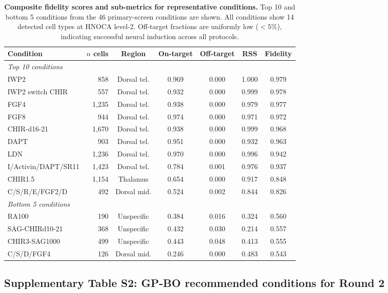 \documentclass[times,twoside]{zHenriquesLab-StyleBioRxiv}
\begin{document}
\begin{table}[H]
\centering
\caption{\textbf{Composite fidelity scores and sub-metrics for representative conditions.} Top 10 and bottom 5 conditions from the 46 primary-screen conditions are shown. All conditions show 14 detected cell types at HNOCA level-2. Off-target fractions are uniformly low ($<5\%$), indicating successful neural induction across all protocols.}\label{tab:fidelity-supp}
\small
\begin{tabular}{@{}lrccccc@{}}
\toprule
\textbf{Condition} & \textbf{$n$ cells} & \textbf{Region} & \textbf{On-target} & \textbf{Off-target} & \textbf{RSS} & \textbf{Fidelity} \\
\midrule
\multicolumn{7}{l}{\textit{Top 10 conditions}} \\
IWP2 & 858 & Dorsal tel. & 0.969 & 0.000 & 1.000 & 0.979 \\
IWP2 switch CHIR & 557 & Dorsal tel. & 0.932 & 0.000 & 0.999 & 0.978 \\
FGF4 & 1,235 & Dorsal tel. & 0.938 & 0.000 & 0.979 & 0.977 \\
FGF8 & 944 & Dorsal tel. & 0.974 & 0.000 & 0.971 & 0.972 \\
CHIR-d16-21 & 1,670 & Dorsal tel. & 0.938 & 0.000 & 0.999 & 0.968 \\
DAPT & 903 & Dorsal tel. & 0.951 & 0.000 & 0.932 & 0.963 \\
LDN & 1,236 & Dorsal tel. & 0.970 & 0.000 & 0.996 & 0.942 \\
I/Activin/DAPT/SR11 & 1,423 & Dorsal tel. & 0.784 & 0.001 & 0.976 & 0.937 \\
CHIR1.5 & 1,154 & Thalamus & 0.654 & 0.000 & 0.917 & 0.848 \\
C/S/R/E/FGF2/D & 492 & Dorsal mid. & 0.524 & 0.002 & 0.844 & 0.826 \\
\midrule
\multicolumn{7}{l}{\textit{Bottom 5 conditions}} \\
RA100 & 190 & Unspecific & 0.384 & 0.016 & 0.324 & 0.560 \\
SAG-CHIRd10-21 & 368 & Unspecific & 0.432 & 0.030 & 0.214 & 0.557 \\
CHIR3-SAG1000 & 499 & Unspecific & 0.443 & 0.048 & 0.413 & 0.555 \\
C/S/D/FGF4 & 126 & Dorsal mid. & 0.246 & 0.000 & 0.483 & 0.543 \\
\bottomrule
\end{tabular}
\end{table}

\subsection*{Supplementary Table S2: GP-BO recommended conditions for Round 2}
\end{document}

